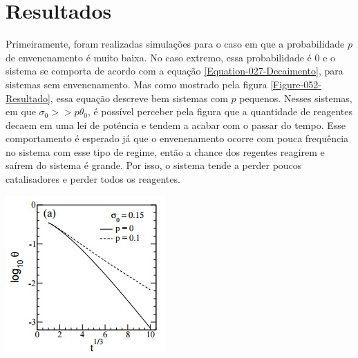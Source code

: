 
\section{Resultados}

Primeiramente, foram realizadas simulações para o caso em que a probabilidade $p$
de envenenamento é muito baixa. No caso extremo, essa probabilidade é 0 e o
sistema se comporta de acordo com a equação \ref{Equation-027-Decaimento}, para
sistemas sem envenenamento. Mas como mostrado pela figura
\ref{Figure-052-Resultado}, essa equação descreve bem sistemas com $p$ pequenos.
Nesses sistemas, em que $\sigma_0 >> p \theta_0$, é possível perceber pela
figura que a quantidade de reagentes decaem em uma lei de potência e tendem a
acabar com o passar do tempo. Esse comportamento é esperado já que o
envenenamento ocorre com pouca frequência no sistema com esse tipo de regime,
então a chance dos regentes reagirem e saírem do sistema é grande. Por isso, o
sistema tende a perder poucos catalisadores e perder todos os reagentes.

{
	\captionsetup{type=figure}
	\hfill \break
	\includegraphics[width=\columnwidth]{./figures/052-Resultado.jpg}
	\label{Figure-052-Resultado}
}

